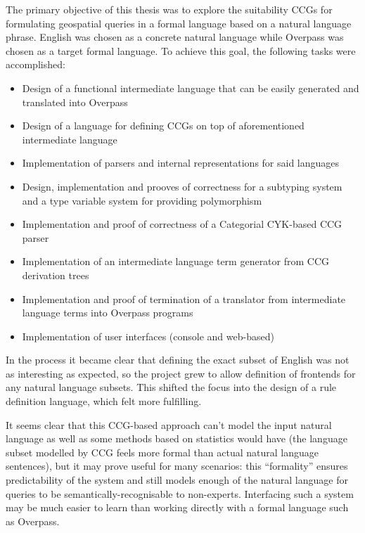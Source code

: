 \documentclass[main.tex]{subfiles}
\begin{document}
The primary objective of this thesis was to explore the suitability CCGs
for formulating geospatial queries in a formal language based on a
natural language phrase. English was chosen as a concrete natural language
while Overpass was chosen as a target formal language.
To achieve this goal, the following tasks were accomplished:

\begin{itemize}
    \item Design of a functional intermediate language that can be
        easily generated and translated into Overpass
    \item Design of a language for defining CCGs on top of aforementioned
        intermediate language
    \item Implementation of parsers and internal representations for said
        languages
    \item Design, implementation and prooves of correctness for
        a subtyping system and a type variable system for providing
        polymorphism
    \item Implementation and proof of correctness of a Categorial CYK-based
        CCG parser
    \item Implementation of an intermediate language term generator from
        CCG derivation trees
    \item Implementation and proof of termination of a translator from
        intermediate language terms into Overpass programs
    \item Implementation of user interfaces (console and web-based)
\end{itemize}

In the process it became clear that defining the exact subset of English
was not as interesting as expected, so the project grew to allow
definition of frontends for any natural language subsets. This shifted the
focus into the design of a rule definition language, which felt more
fulfilling.

It seems clear that this CCG-based approach can't model the input natural
language as well as some methods based on statistics would have
(the language subset modelled by CCG feels more formal than actual
natural language sentences), but it
may prove useful for many scenarios: this ``formality'' ensures predictability
of the system and still models enough of the natural language for queries
to be semantically-recognisable to non-experts. Interfacing such a system
may be much easier to learn than working directly with a formal language
such as Overpass.
\end{document}
